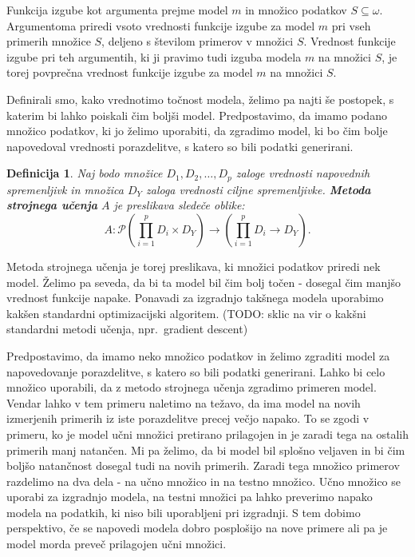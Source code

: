 \documentclass[12pt,a4paper]{article}
\newtheorem{definicija}{Definicija}
\begin{document}
Funkcija izgube kot argumenta prejme model $m$ in množico podatkov $S \subseteq \omega$. Argumentoma priredi vsoto vrednosti funkcije izgube za model $m$ pri vseh primerih množice $S$, deljeno s številom primerov v množici $S$. Vrednost funkcije izgube pri teh argumentih, ki ji pravimo tudi izguba modela $m$ na množici $S$, je torej povprečna vrednost funkcije izgube za model $m$ na množici $S$.

Definirali smo, kako vrednotimo točnost modela, želimo pa najti še postopek, s katerim bi lahko poiskali čim boljši model. Predpostavimo, da imamo podano množico podatkov, ki jo želimo uporabiti, da zgradimo model, ki bo čim bolje napovedoval vrednosti porazdelitve, s katero so bili podatki generirani.

\begin{definicija}
Naj bodo množice $D_1, D_2, \ldots, D_p$ zaloge vrednosti napovednih spremenljivk in množica $D_Y$ zaloga vrednosti ciljne spremenljivke. 
\textbf{Metoda strojnega učenja} $A$ je preslikava sledeče oblike:
\[
A: \mathcal{P}(\prod_{i=1}^p D_i \times D_Y) \rightarrow (\prod_{i=1}^p D_i \rightarrow D_Y).
\]
\end{definicija}

Metoda strojnega učenja je torej preslikava, ki množici podatkov priredi nek model. Želimo pa seveda, da bi ta model bil čim bolj točen - dosegal čim manjšo vrednost funkcije napake. Ponavadi za izgradnjo takšnega modela uporabimo kakšen standardni optimizacijski algoritem. (TODO: sklic na vir o kakšni standardni metodi učenja, npr.\ gradient descent)

Predpostavimo, da imamo neko množico podatkov in želimo zgraditi model za napovedovanje porazdelitve, s katero so bili podatki generirani. 
Lahko bi celo množico uporabili, da z metodo strojnega učenja zgradimo primeren model. 
Vendar lahko v tem primeru naletimo na težavo, da ima model na novih izmerjenih primerih iz iste porazdelitve precej večjo napako. 
To se zgodi v primeru, ko je model učni množici pretirano prilagojen in je zaradi tega na ostalih primerih manj natančen. 
Mi pa želimo, da bi model bil splošno veljaven in bi čim boljšo natančnost dosegal tudi na novih primerih. 
Zaradi tega množico primerov razdelimo na dva dela - na učno množico in na testno množico. 
Učno množico se uporabi za izgradnjo modela, na testni množici pa lahko preverimo napako modela na podatkih, ki niso bili uporabljeni pri izgradnji. 
S tem dobimo perspektivo, če se napovedi modela dobro posplošijo na nove primere ali pa je model morda preveč prilagojen učni množici.
\end{document}
